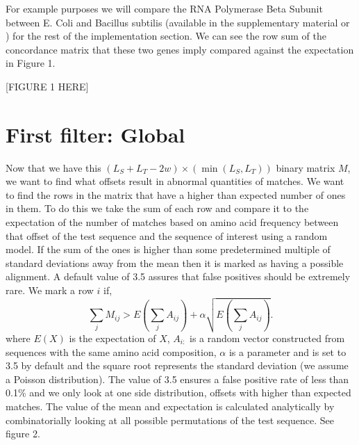 \documentclass[phd,tocprelim]{cornell}
\renewcommand{\caption}[1]{\singlespacing\hangcaption{#1}\normalspacing}
\begin{document}
For example purposes we will compare the RNA Polymerase Beta Subunit between E. Coli and Bacillus subtilis (available in the supplementary material or \cite{GenBank}) for the rest of the implementation section. We can see the row sum of the concordance matrix that these two genes imply compared against the expectation in Figure 1.

[FIGURE 1 HERE]


\section{First filter: Global}

Now that we have this $(L_{S} + L_{T}-2w) \times (\min(L_{S},L_{T}))$ binary matrix $M$, we want to find what offsets result in abnormal quantities of matches. We want to find the rows in the matrix that have a higher than expected number of ones in them. To do this we take the sum of each row and compare it to the expectation of the number of matches based on amino acid frequency between that offset of the test sequence and the sequence of interest using a random model. If the sum of the ones is higher than some predetermined multiple of standard deviations away from the mean then it is marked as having a possible alignment. A default value of 3.5 assures that false positives should be extremely rare. We mark a row $i$ if,
\begin{equation}
    \sum_{j} M_{ij} > E\left(\sum_{j} A_{ij}\right) + \alpha \sqrt{E\left(\sum_{j} A_{ij}\right)}.
\end{equation}
where $E(X)$ is the expectation of $X$, $A_{i:}$ is a random vector constructed from sequences with the same amino acid composition, $\alpha$ is a parameter and is set to 3.5 by default and the square root represents the standard deviation (we assume a Poisson distribution). The value of 3.5 ensures a false positive rate of less than 0.1\% and we only look at one side distribution, offsets with higher than expected matches. The value of the mean and expectation is calculated analytically by combinatorially looking at all possible permutations of the test sequence. See figure 2.
\end{document}
